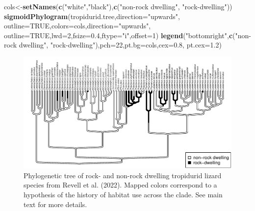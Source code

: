 \documentclass[fleqn,10pt,lineno]{wlpeerj} %
\newenvironment{Shaded}{\begin{snugshade}}{\end{snugshade}}
\newcommand{\AttributeTok}[1]{\textcolor[rgb]{0.13,0.29,0.53}{#1}}
\newcommand{\ConstantTok}[1]{\textcolor[rgb]{0.56,0.35,0.01}{#1}}
\newcommand{\DecValTok}[1]{\textcolor[rgb]{0.00,0.00,0.81}{#1}}
\newcommand{\FloatTok}[1]{\textcolor[rgb]{0.00,0.00,0.81}{#1}}
\newcommand{\FunctionTok}[1]{\textcolor[rgb]{0.13,0.29,0.53}{\textbf{#1}}}
\newcommand{\NormalTok}[1]{#1}
\newcommand{\OtherTok}[1]{\textcolor[rgb]{0.56,0.35,0.01}{#1}}
\newcommand{\StringTok}[1]{\textcolor[rgb]{0.31,0.60,0.02}{#1}}
\begin{document}
\begin{Shaded}
\begin{Highlighting}[]
\NormalTok{cols}\OtherTok{\textless{}{-}}\FunctionTok{setNames}\NormalTok{(}\FunctionTok{c}\NormalTok{(}\StringTok{"white"}\NormalTok{,}\StringTok{"black"}\NormalTok{),}\FunctionTok{c}\NormalTok{(}\StringTok{"non{-}rock dwelling"}\NormalTok{,}
  \StringTok{"rock{-}dwelling"}\NormalTok{))}
\FunctionTok{sigmoidPhylogram}\NormalTok{(tropidurid.tree,}\AttributeTok{direction=}\StringTok{"upwards"}\NormalTok{,}
  \AttributeTok{outline=}\ConstantTok{TRUE}\NormalTok{,}\AttributeTok{colors=}\NormalTok{cols,}\AttributeTok{direction=}\StringTok{"upwards"}\NormalTok{,}
  \AttributeTok{outline=}\ConstantTok{TRUE}\NormalTok{,}\AttributeTok{lwd=}\DecValTok{2}\NormalTok{,}\AttributeTok{fsize=}\FloatTok{0.4}\NormalTok{,}\AttributeTok{ftype=}\StringTok{"i"}\NormalTok{,}\AttributeTok{offset=}\DecValTok{1}\NormalTok{)}
\FunctionTok{legend}\NormalTok{(}\StringTok{"bottomright"}\NormalTok{,}\FunctionTok{c}\NormalTok{(}\StringTok{"non{-}rock dwelling"}\NormalTok{,}
  \StringTok{"rock{-}dwelling"}\NormalTok{),}\AttributeTok{pch=}\DecValTok{22}\NormalTok{,}\AttributeTok{pt.bg=}\NormalTok{cols,}\AttributeTok{cex=}\FloatTok{0.8}\NormalTok{,}
  \AttributeTok{pt.cex=}\FloatTok{1.2}\NormalTok{)}
\end{Highlighting}
\end{Shaded}

\begin{figure}
\includegraphics[width=1\linewidth]{Revell.phytools-v2_peerj_files/figure-latex/fig13-trop-tree-1} \caption{Phylogenetic tree of rock- and non-rock dwelling tropidurid lizard species from Revell et al. (2022). Mapped colors correspond to a hypothesis of the history of habitat use across the clade. See main text for more details.}\label{fig:fig13-trop-tree}
\end{figure}
\end{document}

